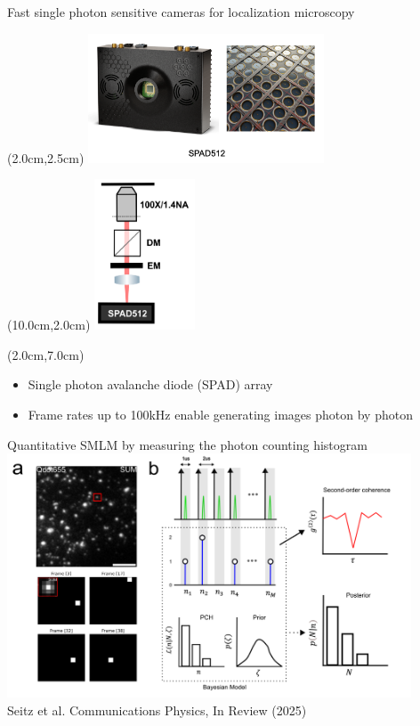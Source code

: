 \documentclass{beamer}					%
\begin{document}
\begin{frame}{Fast single photon sensitive cameras for localization microscopy}
\begin{textblock*}{7cm}(2.0cm,2.5cm)
\includegraphics[width=7cm]{../../postdoc/sartorius/media/SPAD512.png}
\end{textblock*}
\begin{textblock*}{3cm}(10.0cm,2.0cm)
\includegraphics[width=3cm]{../../phd/spad/spad//media/Setup-Simple.png}
\end{textblock*}
\begin{textblock*}{10cm}(2.0cm,7.0cm)
\begin{itemize}
\item Single photon avalanche diode (SPAD) array
\item Frame rates up to 100kHz enable generating images photon by photon
\end{itemize}
\end{textblock*}
\end{frame}

\begin{frame}{Quantitative SMLM by measuring the photon counting histogram}
\includegraphics[width=12cm]{../../phd/spad/spad/media/Figure-0.png}
\\Seitz et al. Communications Physics, In Review (2025)
\end{frame}
\end{document}

